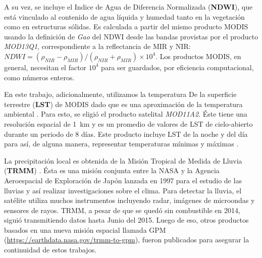   \par A su vez, se incluye el Indice de Agua de Diferencia Normalizada
    (\textbf{NDWI}), que está vinculado al contenido de agua líquida y humedad
    tanto en la vegetación como en estructuras sólidas.
    Es calculada a partir del mismo producto MODIS usando la definición de
    \textit{Gao} \cite{gao_ndwi} del NDWI desde las bandas provistas por
    el producto \textit{MOD13Q1}, correspondiente a la reflectancia de MIR y NIR:
    $NDWI =  (\rho_{NIR} - \rho_{MIR}) / (\rho_{NIR}  + \rho_{MIR} ) \times 10^4$.
    Los productos MODIS, en general, necesitan el factor $10^{4}$ para ser guardados,
    por eficiencia computacional, como números enteros.

  \par En este trabajo, adicionalmente, utilizamos la temperatura De la superficie
    terrestre (\textbf{LST}) de MODIS dado que es una aproximación de la
    temperatura ambiental \cite{infectious_diseases, surface_temp, temp_algorithm}.
    Para esto, se eligió el producto satelital \textit{MOD11A2}. Éste tiene una
    resolución espacial de \SI{1}{\kilo\meter} y es un promedio de valores de
    LST de cielo-abierto durante un periodo de 8 días. Este producto incluye
    LST de la noche y del día para así, de alguna manera, representar
    temperaturas mínimas y máximas \cite{lst_surface}.

  \par La precipitación local es obtenida de la Misión Tropical de Medida de Lluvia
    (\textbf{TRMM}) \cite{trmm_mision}. Ésta es una misión conjunta entre la
    NASA y la Agencia Aeroespacial de Exploración de Japón lanzada en 1997
    para el estudio de las lluvias y así realizar investigaciones sobre el
    clima. Para detectar la lluvia, el satélite utiliza muchos instrumentos
    incluyendo radar, imágenes de microondas y sensores de rayos. TRMM, a pesar
    de que se quedó sin combustible en 2014, siguió transmitiendo datos hasta
    Junio del 2015.
    Luego de eso, otros productos basados en una nueva misión espacial llamada
    GPM (\url{https://earthdata.nasa.gov/trmm-to-gpm}), fueron publicados para
    asegurar la continuidad de estos trabajos.



